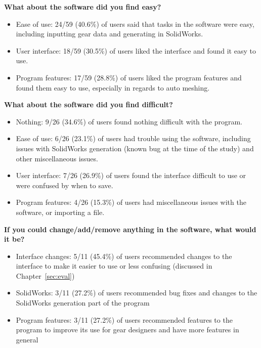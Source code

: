 \begin{doublespace}
\begin{singlespace}
\textbf{What about the software did you find easy?}
\begin{itemize}
    \item Ease of use: 24/59 (40.6\%) of users said that tasks in the software were easy, including inputting gear data and generating in SolidWorks.
    \item User interface: 18/59 (30.5\%) of users liked the interface and found it easy to use.
    \item Program features: 17/59 (28.8\%) of users liked the program features and found them easy to use, especially in regards to auto meshing.
\end{itemize}

\textbf{What about the software did you find difficult?}
\begin{itemize}
    \item Nothing: 9/26 (34.6\%) of users found nothing difficult with the program.
    \item Ease of use: 6/26 (23.1\%) of users had trouble using the software, including issues with SolidWorks generation (known bug at the time of the study) and other miscellaneous issues.
    \item User interface: 7/26 (26.9\%) of users found the interface difficult to use or were confused by when to save.
    \item Program features: 4/26 (15.3\%) of users had miscellaneous issues with the software, or importing a file.
\end{itemize}

\textbf{If you could change/add/remove anything in the software, what would it be?}
\begin{itemize}
    \item Interface changes: 5/11 (45.4\%) of users recommended changes to the interface to make it easier to use or less confusing (discussed in Chapter~\ref{sec:eval})
    \item SolidWorks: 3/11 (27.2\%) of users recommended bug fixes and changes to the SolidWorks generation part of the program
    \item Program features: 3/11 (27.2\%) of users recommended features to the program to improve its use for gear designers and have more features in general
\end{itemize}

\end{singlespace}


\end{doublespace}